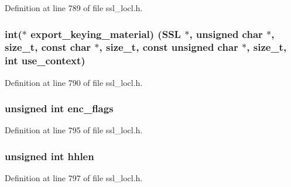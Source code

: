 Definition at line 789 of file ssl\+\_\+locl.\+h.

\subsubsection[{\texorpdfstring{export\+\_\+keying\+\_\+material}{export_keying_material}}]{\setlength{\rightskip}{0pt plus 5cm}int($\ast$ export\+\_\+keying\+\_\+material) ({\bf S\+SL} $\ast$, unsigned char $\ast$, size\+\_\+t, const char $\ast$, size\+\_\+t, const unsigned char $\ast$, size\+\_\+t, int use\+\_\+context)}\hypertarget{structssl3__enc__method_a7aa367911e64007691d15195f16ccdd7}{}\label{structssl3__enc__method_a7aa367911e64007691d15195f16ccdd7}


Definition at line 790 of file ssl\+\_\+locl.\+h.

\subsubsection[{\texorpdfstring{enc\+\_\+flags}{enc_flags}}]{\setlength{\rightskip}{0pt plus 5cm}unsigned int enc\+\_\+flags}\hypertarget{structssl3__enc__method_ac939f8a119299e9cc64f39eb5b9a5af9}{}\label{structssl3__enc__method_ac939f8a119299e9cc64f39eb5b9a5af9}


Definition at line 795 of file ssl\+\_\+locl.\+h.

\subsubsection[{\texorpdfstring{hhlen}{hhlen}}]{\setlength{\rightskip}{0pt plus 5cm}unsigned int hhlen}\hypertarget{structssl3__enc__method_a58669083084f3291a52519bee866eb85}{}\label{structssl3__enc__method_a58669083084f3291a52519bee866eb85}


Definition at line 797 of file ssl\+\_\+locl.\+h.


